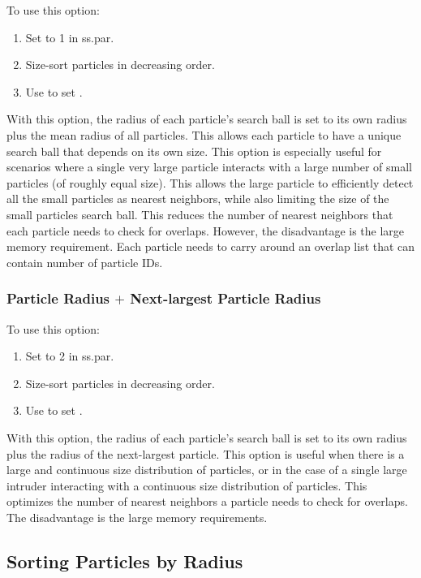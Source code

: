 To use this option:
\begin{enumerate}
  \item Set  to 1 in ss.par.
  \item Size-sort particles in decreasing order.
  \item Use  to set
    .
\end{enumerate}
With this option, the radius of each particle's search ball is set to
its own radius plus the mean radius of all particles. This allows each
particle to have a unique search ball that depends on its own
size. This option is especially useful for scenarios where a single
very large particle interacts with a large number of small particles
(of roughly equal size). This allows the large particle to efficiently
detect all the small particles as nearest neighbors, while also
limiting the size of the small particles search ball. This reduces the
number of nearest neighbors that each particle needs to check for
overlaps. However, the disadvantage is the large memory
requirement. Each particle needs to carry around an overlap list that
can contain  number of
particle IDs.

\subsubsection{Particle Radius $+$ Next-largest Particle Radius}

To use this option:
\begin{enumerate}
  \item Set  to 2 in ss.par.
  \item Size-sort particles in decreasing order.
  \item Use  to set
    .
\end{enumerate}
With this option, the radius of each particle's search ball is set to
its own radius plus the radius of the next-largest particle. This
option is useful when there is a large and continuous size
distribution of particles, or in the case of a single large intruder
interacting with a continuous size distribution of particles. This
optimizes the number of nearest neighbors a particle needs to check
for overlaps. The disadvantage is the large memory requirements.

\subsection{Sorting Particles by Radius}

